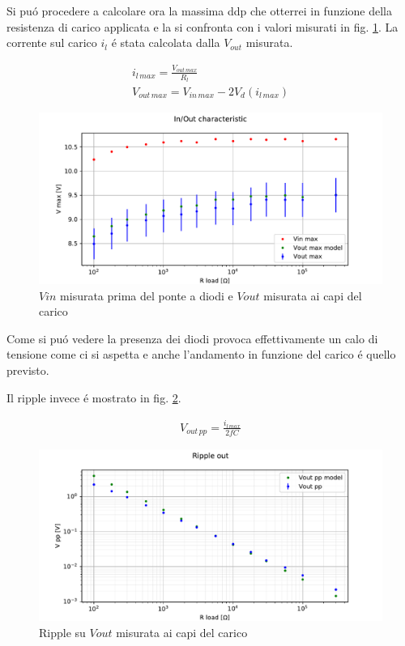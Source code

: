 Si pu\'o procedere a calcolare ora la massima ddp che otterrei in funzione della resistenza di carico applicata e la si confronta con i valori misurati in fig. \ref{fig:vmaxcconf}. La corrente sul carico $i_l$ \'e stata calcolata dalla $V_{out}$ misurata.

\begin{gather}
	i_{l\, max} = \frac{V_{out\, max}}{R_l} \\
	V_{out\, max} = V_{in\, max} - 2 V_d(i_{l\, max}) 
\end{gather}

\begin{figure}[h]
\centering
\includegraphics[width=\textwidth]{fig1.pdf}
\caption{$Vin$ misurata prima del ponte a diodi e $Vout$ misurata ai capi del carico}
\label{fig:vmaxcconf}
\end{figure}

Come si pu\'o vedere la presenza dei diodi provoca effettivamente un calo di tensione come ci si aspetta e anche l'andamento in funzione del carico \'e quello previsto.

Il ripple invece \'e mostrato in fig. \ref{fig:vppcconf}.

\begin{gather}
	V_{out\, pp} = \frac{i_{l\, max}}{2 f C}
\end{gather}

\begin{figure}[h]
\centering
\includegraphics[width=\textwidth]{fig2.pdf}
\caption{Ripple su $Vout$ misurata ai capi del carico}
\label{fig:vppcconf}
\end{figure}


